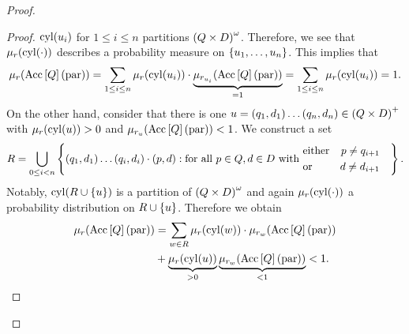 \begin{proof}
\begin{proof}
    $\operatorname{cyl}(u_{i})$ for $1\leq i\leq n$ partitions $\left(Q\times D\right)^{\omega}$.
    Therefore, we see that $\mu_{r}(\operatorname{cyl}(\cdot))$ describes a probability 
    measure on $\left\{u_{1}, \dots, u_{n}\right\}$. This implies that
    \begin{equation*}
      \mu_{r}(\operatorname{Acc}\left[Q\right](\operatorname{par})) = \sum\limits_{1\leq i\leq n}
        \mu_{r}(\operatorname{cyl}(u_{i}))\cdot\underbrace{\mu_{r_{u_{i}}}(
        \operatorname{Acc}\left[Q\right](\operatorname{par}))}_{=1} = \sum\limits_{1\leq i\leq n}
        \mu_{r}(\operatorname{cyl}(u_{i})) = 1.
    \end{equation*}
    On the other hand, consider that there is one 
    $u = \left(q_{1}, d_{1}\right)\dots\left(q_{n}, d_{n}\right)\in\left(Q\times D\right)^{+}$
    with $\mu_{r}(\operatorname{cyl}(u)) > 0$ and 
    $\mu_{r_{u}}(\operatorname{Acc}\left[Q\right](\operatorname{par})) < 1$. We construct a set 
    \begin{equation*}
      R = \bigcup\limits_{0\leq i < n}\left\{
        \left(q_{1}, d_{1}\right)\dots\left(q_{i}, d_{i}\right)\cdot\left(p, d\right):
          \text{for all }p\in Q,d\in D\text{ with }
        \begin{aligned}
            &\text{either}&p\neq q_{i+1}\\
            &\text{or}&d\neq d_{i+1}&
        \end{aligned}
      \right\}.
    \end{equation*}
    Notably, $\operatorname{cyl}(R\cup\left\{u\right\})$ is a partition of 
    $\left(Q\times D\right)^{\omega}$ and again $\mu_{r}(\operatorname{cyl}(\cdot))$ a probability
    distribution on $R\cup\left\{u\right\}$. Therefore we obtain
    \begin{align*}
      \mu_{r}(\operatorname{Acc}\left[Q\right](\operatorname{par})) &= \sum\limits_{w\in R}
        \mu_{r}(\operatorname{cyl}(w))\cdot\mu_{r_{w}}(\operatorname{Acc}\left[Q\right](\operatorname{par}))\\
      &+ \underbrace{\mu_{r}(\operatorname{cyl}(u))}_{>0}\underbrace{\mu_{r_{w}}(
        \operatorname{Acc}\left[Q\right](\operatorname{par}))}_{<1} < 1.
    \end{align*}
  \end{proof}
  

\end{proof}
